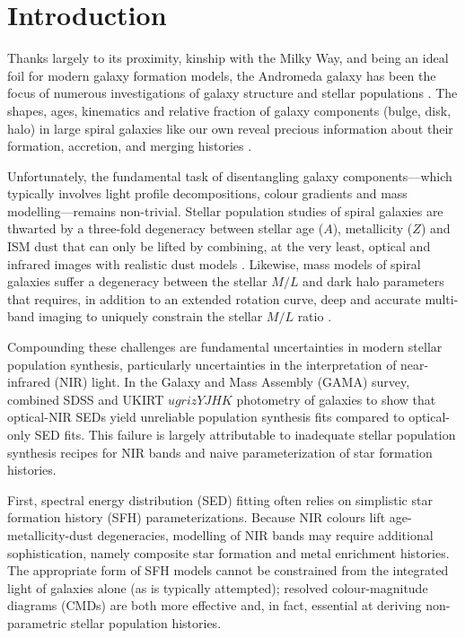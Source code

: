 \documentclass[iop]{emulateapj}
\begin{document}
\section{Introduction}
\label{sec:intro}

Thanks largely to its proximity, kinship with the Milky Way, and being an ideal foil for modern galaxy formation models, the Andromeda galaxy has been the focus of numerous investigations of galaxy structure \citep{Ibata:2005,Irwin:2005,McConnachie:2009,Courteau:2011}
and stellar populations \citep{Williams:2002,Worthey:2005,Saglia:2010}.
The shapes, ages, kinematics and relative fraction of galaxy components (bulge, disk, halo) in large spiral galaxies like our own reveal precious information about their formation, accretion, and merging histories \citep[see the review of][]{Kormendy:2004}.

Unfortunately, the fundamental task of disentangling galaxy components---which typically involves light profile decompositions, colour gradients and mass modelling---remains non-trivial.
Stellar population studies of spiral galaxies are thwarted by a three-fold degeneracy between stellar age ($A$), metallicity ($Z$) and ISM dust that can only be lifted by combining, at the very least, optical and infrared images with realistic dust models \citep{de-Jong:1996b,MacArthur:2004,Pforr:2012}.
Likewise, mass models of spiral galaxies suffer a degeneracy between the stellar $M/L$ and dark halo parameters that requires, in addition to an extended rotation curve, deep and accurate multi-band imaging to uniquely constrain the stellar $M/L$ ratio \citep{Dutton:2005}. 

Compounding these challenges are fundamental uncertainties in modern stellar population synthesis, particularly uncertainties in the interpretation of near-infrared (NIR) light.
In the Galaxy and Mass Assembly (GAMA) survey, \cite{Taylor:2011} combined SDSS and UKIRT $ugrizYJHK$ photometry of galaxies to show that optical-NIR SEDs yield unreliable population synthesis fits compared to optical-only SED fits.
This failure is largely attributable to inadequate stellar population synthesis recipes for NIR bands and naive parameterization of star formation histories.

First, spectral energy distribution (SED) fitting often relies on simplistic star formation history (SFH) parameterizations.
Because NIR colours lift age-metallicity-dust degeneracies, modelling of NIR bands may require additional sophistication, namely composite star formation and metal enrichment histories.
The appropriate form of SFH models cannot be constrained from the integrated light of galaxies alone (as is typically attempted); resolved colour-magnitude diagrams (CMDs) are both more effective and, in fact, essential at deriving non-parametric stellar population histories. 
\end{document}
